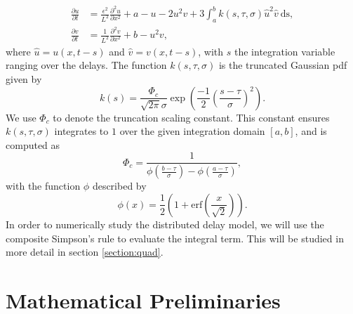 \begin{equation}\label{distmodel}
  \begin{split}
    \frac{\partial u}{\partial t}&=\frac{\epsilon^2}{L^2}\frac{\partial^2u}{\partial x^2}+a-u-2u^2v+3\int_{a}^{b}k(s,\tau,\sigma)\hat{u}^2\hat{v} \ \text{ds},\\
    \frac{\partial v}{\partial t}&=\frac{1}{L^2}\frac{\partial^2v}{\partial x^2}+b-u^2v,
\end{split}
\end{equation}
where $\hat{u}=u(x,t-s)$ and $\hat{v}=v(x,t-s)$, with $s$ the integration variable ranging over the delays. The function $k(s,\tau,\sigma)$ is the truncated Gaussian pdf given by \cite{wikitrunc}
\begin{equation}
  k(s)=\frac{\Phi_c}{\sqrt{2\pi}\sigma}\exp\left(\frac{-1}{2}\left(\frac{s-\tau}{\sigma}\right)^2\right).
\end{equation}
We use $\Phi_c$ to denote the truncation scaling constant. This constant ensures $k(s,\tau,\sigma)$ integrates to $1$ over the given integration domain $[a, b]$, and is computed as
\begin{equation}
\Phi_c=\frac{1}{\phi\left(\frac{b-\tau}{\sigma}\right)-\phi\left(\frac{a-\tau}{\sigma}\right)},
\end{equation}
with the function $\phi$ described by
\begin{equation}
\phi(x)=\frac{1}{2}\left(1+\text{erf}\left(\frac{x}{\sqrt{2}}\right)\right).
\end{equation}
In order to numerically study the distributed delay model, we will use the composite Simpson's rule to evaluate the integral term. This will be studied in more detail in section \ref{section:quad}.

\section{Mathematical Preliminaries}
